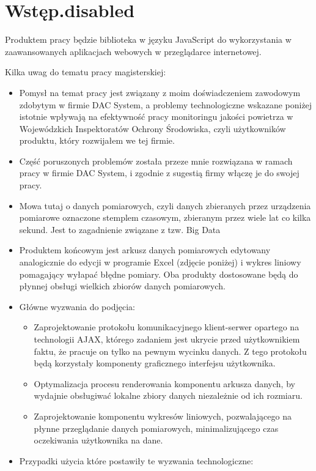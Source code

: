 
\chapter{Wstęp.disabled}

Produktem pracy będzie biblioteka w języku JavaScript do wykorzystania w zaawansowanych aplikacjach webowych w przeglądarce internetowej.


Kilka uwag do tematu pracy magisterskiej:
\begin{itemize}
	\item Pomysł na temat pracy jest związany z moim doświadczeniem zawodowym zdobytym w firmie DAC System, a problemy technologiczne wskazane poniżej istotnie wpływają na efektywność pracy monitoringu jakości powietrza w Wojewódzkich Inspektoratów Ochrony Środowiska, czyli użytkowników produktu, który rozwijałem we tej firmie.
	\item Część poruszonych problemów została przeze mnie rozwiązana w ramach pracy w firmie DAC System, i zgodnie z sugestią firmy włączę je do swojej pracy.
	\item Mowa tutaj o danych pomiarowych, czyli danych zbieranych przez urządzenia pomiarowe oznaczone stemplem czasowym, zbieranym przez wiele lat co kilka sekund. Jest to zagadnienie związane z tzw. Big Data
	\item Produktem końcowym jest arkusz danych pomiarowych edytowany analogicznie do edycji w programie Excel (zdjęcie poniżej) i wykres liniowy pomagający wyłapać błędne pomiary. Oba produkty dostosowane będą do płynnej obsługi wielkich zbiorów danych pomiarowych.
	\item Główne wyzwania do podjęcia:
		\begin{itemize}
			\item Zaprojektowanie protokołu komunikacyjnego klient-serwer opartego na technologii AJAX, którego zadaniem jest ukrycie przed użytkownikiem faktu, że pracuje on tylko na pewnym wycinku danych. Z tego protokołu będą korzystały komponenty graficznego interfejsu użytkownika.
			\item Optymalizacja procesu renderowania komponentu arkusza danych, by wydajnie obsługiwać lokalne zbiory danych niezależnie od ich rozmiaru.
			\item Zaprojektowanie komponentu wykresów liniowych, pozwalającego na płynne przeglądanie danych pomiarowych, minimalizującego czas oczekiwania użytkownika na dane.
		\end{itemize}
	\item Przypadki użycia które postawiły te wyzwania technologiczne:

\end{itemize}
